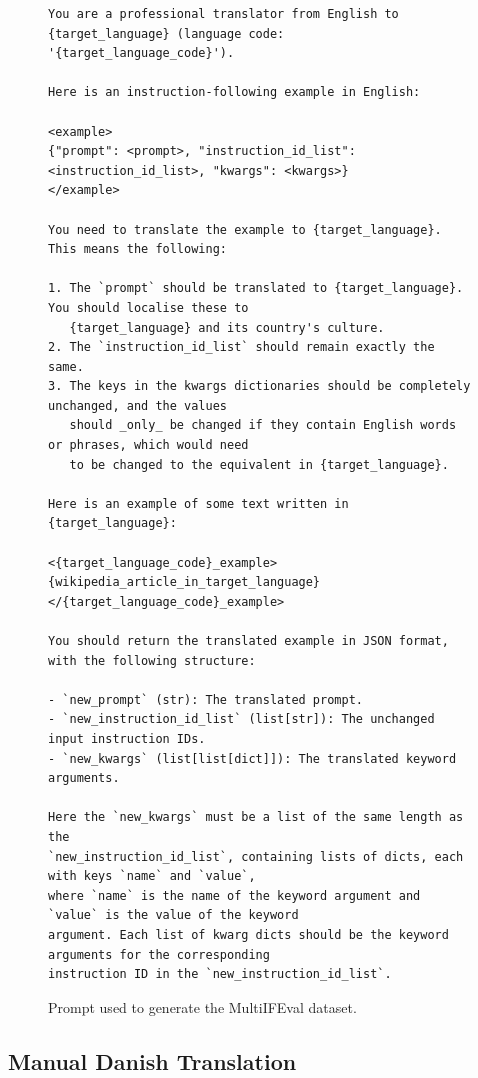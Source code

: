 \documentclass[11pt]{article}
\begin{document}
\begin{figure}[h]
\centering
\small
\begin{verbatim}
You are a professional translator from English to {target_language} (language code:
'{target_language_code}').

Here is an instruction-following example in English:

<example>
{"prompt": <prompt>, "instruction_id_list": <instruction_id_list>, "kwargs": <kwargs>}
</example>

You need to translate the example to {target_language}. This means the following:

1. The `prompt` should be translated to {target_language}. You should localise these to
   {target_language} and its country's culture.
2. The `instruction_id_list` should remain exactly the same.
3. The keys in the kwargs dictionaries should be completely unchanged, and the values
   should _only_ be changed if they contain English words or phrases, which would need
   to be changed to the equivalent in {target_language}.

Here is an example of some text written in {target_language}:

<{target_language_code}_example>
{wikipedia_article_in_target_language}
</{target_language_code}_example>

You should return the translated example in JSON format, with the following structure:

- `new_prompt` (str): The translated prompt.
- `new_instruction_id_list` (list[str]): The unchanged input instruction IDs.
- `new_kwargs` (list[list[dict]]): The translated keyword arguments.

Here the `new_kwargs` must be a list of the same length as the
`new_instruction_id_list`, containing lists of dicts, each with keys `name` and `value`,
where `name` is the name of the keyword argument and `value` is the value of the keyword
argument. Each list of kwarg dicts should be the keyword arguments for the corresponding
instruction ID in the `new_instruction_id_list`.
\end{verbatim}
\caption{Prompt used to generate the MultiIFEval dataset.}
\label{fig:prompt}
\end{figure}


\subsection{Manual Danish Translation}
\label{sec:manual-danish-translation}
\end{document}
